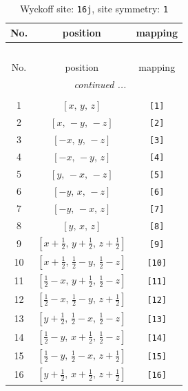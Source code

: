 \documentclass[fleqn,8pt]{jsarticle}
\begin{document}
\begin{longtable}{ccc}
\caption{Wyckoff site: {\tt 16j}, site symmetry: {\tt 1}}
 \\
 \hline \hline
No. & position & mapping \\ \hline \endfirsthead

\multicolumn{2}{l}{\tablename\ \thetable{}} \\
 \hline \hline
No. & position & mapping \\ \hline \endhead

 \hline \hline
\multicolumn{2}{r}{\footnotesize\it continued ...} \\ \endfoot

 \hline \hline
\multicolumn{2}{r}{} \\ \endlastfoot

1 & $\left[ x,\, y,\, z \right]$ & {\tt [1]} \\ \hline
2 & $\left[ x,\, - y,\, - z \right]$ & {\tt [2]} \\ \hline
3 & $\left[ - x,\, y,\, - z \right]$ & {\tt [3]} \\ \hline
4 & $\left[ - x,\, - y,\, z \right]$ & {\tt [4]} \\ \hline
5 & $\left[ y,\, - x,\, - z \right]$ & {\tt [5]} \\ \hline
6 & $\left[ - y,\, x,\, - z \right]$ & {\tt [6]} \\ \hline
7 & $\left[ - y,\, - x,\, z \right]$ & {\tt [7]} \\ \hline
8 & $\left[ y,\, x,\, z \right]$ & {\tt [8]} \\ \hline
9 & $\left[ x + \frac{1}{2},\, y + \frac{1}{2},\, z + \frac{1}{2} \right]$ & {\tt [9]} \\ \hline
10 & $\left[ x + \frac{1}{2},\, \frac{1}{2} - y,\, \frac{1}{2} - z \right]$ & {\tt [10]} \\ \hline
11 & $\left[ \frac{1}{2} - x,\, y + \frac{1}{2},\, \frac{1}{2} - z \right]$ & {\tt [11]} \\ \hline
12 & $\left[ \frac{1}{2} - x,\, \frac{1}{2} - y,\, z + \frac{1}{2} \right]$ & {\tt [12]} \\ \hline
13 & $\left[ y + \frac{1}{2},\, \frac{1}{2} - x,\, \frac{1}{2} - z \right]$ & {\tt [13]} \\ \hline
14 & $\left[ \frac{1}{2} - y,\, x + \frac{1}{2},\, \frac{1}{2} - z \right]$ & {\tt [14]} \\ \hline
15 & $\left[ \frac{1}{2} - y,\, \frac{1}{2} - x,\, z + \frac{1}{2} \right]$ & {\tt [15]} \\ \hline
16 & $\left[ y + \frac{1}{2},\, x + \frac{1}{2},\, z + \frac{1}{2} \right]$ & {\tt [16]} \\
\end{longtable}
\end{document}
